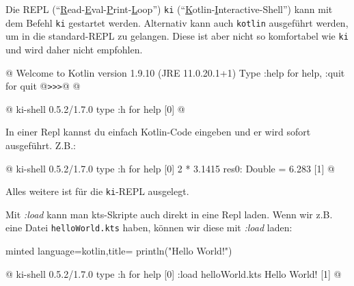 Die REPL (\enquote{\underline{R}ead-\underline{E}val-\underline{P}rint-\underline{L}oop}) \texttt{ki} (\enquote{\underline{K}otlin-\underline{I}nteractive-Shell}) kann mit dem Befehl \texttt{ki} gestartet werden. Alternativ kann auch \texttt{kotlin} ausgeführt werden, um in die standard-REPL zu gelangen. Diese ist aber nicht so komfortabel wie \texttt{ki} und wird daher nicht empfohlen.
\begin{commandshell}[][minted language=text]
    @\shellprefix@kotlin
    Welcome to Kotlin version 1.9.10 (JRE 11.0.20.1+1)
    Type :help for help, :quit for quit
    @\texttt{>>>}@ @\shellcursor@
\end{commandshell}

\begin{commandshell}[][minted language=text]
    @\shellprefix@ki
    ki-shell 0.5.2/1.7.0
    type :h for help
    [0] @\shellcursor@
\end{commandshell}

In einer Repl kannst du einfach Kotlin-Code eingeben und er wird sofort ausgeführt. Z.B.:
\begin{commandshell}[][minted language=text]
    @\shellprefix@ki
    ki-shell 0.5.2/1.7.0
    type :h for help
    [0] 2 * 3.1415
    res0: Double = 6.283
    [1] @\shellcursor@
\end{commandshell}

Alles weitere ist für die \texttt{ki}-REPL ausgelegt.

Mit \textit{:load} kann man kts-Skripte auch direkt in eine Repl laden. Wenn wir z.B. eine Datei \texttt{helloWorld.kts} haben, können wir diese mit \textit{:load} laden:
\begin{codeBlock}[]{minted language=kotlin,title=}
    println("Hello World!")
\end{codeBlock}
\begin{commandshell}[][minted language=text]
    @\shellprefix@ki
    ki-shell 0.5.2/1.7.0
    type :h for help
    [0] :load helloWorld.kts
    Hello World!
    [1] @\shellcursor@
\end{commandshell}

